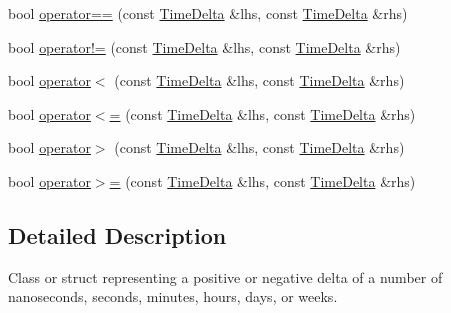 \begin{DoxyCompactItemize}
\item 
bool \hyperlink{structTimeDelta_a9a4d0c810cfb1ede0c5abd2058ffa880}{operator==} (const \hyperlink{structTimeDelta}{\-Time\-Delta} \&lhs, const \hyperlink{structTimeDelta}{\-Time\-Delta} \&rhs)
\item 
bool \hyperlink{structTimeDelta_a34ecf194f14217e5a53721b47b55afea}{operator!=} (const \hyperlink{structTimeDelta}{\-Time\-Delta} \&lhs, const \hyperlink{structTimeDelta}{\-Time\-Delta} \&rhs)
\item 
bool \hyperlink{structTimeDelta_a46cbd1394d5b9a671a2663d1ec292133}{operator$<$} (const \hyperlink{structTimeDelta}{\-Time\-Delta} \&lhs, const \hyperlink{structTimeDelta}{\-Time\-Delta} \&rhs)
\item 
bool \hyperlink{structTimeDelta_af313f41f00c31292ebf02d238270f925}{operator$<$=} (const \hyperlink{structTimeDelta}{\-Time\-Delta} \&lhs, const \hyperlink{structTimeDelta}{\-Time\-Delta} \&rhs)
\item 
bool \hyperlink{structTimeDelta_a321108cfb9e3902874cc743d899c4076}{operator$>$} (const \hyperlink{structTimeDelta}{\-Time\-Delta} \&lhs, const \hyperlink{structTimeDelta}{\-Time\-Delta} \&rhs)
\item 
bool \hyperlink{structTimeDelta_a044ffed3fee34cab3b4abaf4869c5c0c}{operator$>$=} (const \hyperlink{structTimeDelta}{\-Time\-Delta} \&lhs, const \hyperlink{structTimeDelta}{\-Time\-Delta} \&rhs)
\end{DoxyCompactItemize}


\subsection{\-Detailed \-Description}
\-Class or struct representing a positive or negative delta of a number of nanoseconds, seconds, minutes, hours, days, or weeks. 

